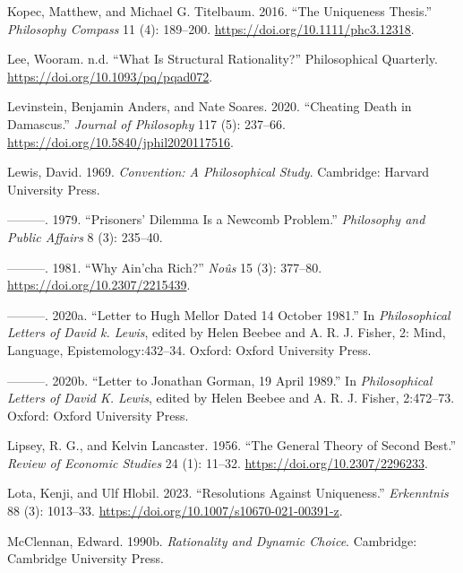 \documentclass[
  12pt,
  letterpaper,
  DIV=11,
  numbers=noendperiod]{scrreprt}
\newlength{\cslhangindent}
\newenvironment{CSLReferences}[2] %
 {\begin{list}{}{%
  \setlength{\itemindent}{0pt}
  \setlength{\leftmargin}{0pt}
  \setlength{\parsep}{0pt}
  \ifodd #1
   \setlength{\leftmargin}{\cslhangindent}
   \setlength{\itemindent}{-1\cslhangindent}
  \fi
  \setlength{\itemsep}{#2\baselineskip}}}
 {\end{list}}
\begin{document}
\begin{CSLReferences}{1}{0}
Kopec, Matthew, and Michael G. Titelbaum. 2016. {``The Uniqueness
Thesis.''} \emph{Philosophy Compass} 11 (4): 189--200.
\url{https://doi.org/10.1111/phc3.12318}.

Lee, Wooram. n.d. {``What Is Structural Rationality?''} Philosophical
Quarterly. \url{https://doi.org/10.1093/pq/pqad072}.

Levinstein, Benjamin Anders, and Nate Soares. 2020. {``Cheating Death in
Damascus.''} \emph{Journal of Philosophy} 117 (5): 237--66.
\url{https://doi.org/10.5840/jphil2020117516}.

Lewis, David. 1969. \emph{Convention: A Philosophical Study}. Cambridge:
Harvard University Press.

---------. 1979. {``Prisoners' Dilemma Is a {N}ewcomb Problem.''}
\emph{Philosophy and Public Affairs} 8 (3): 235--40.

---------. 1981. {``Why Ain'cha Rich?''} \emph{No{û}s} 15 (3): 377--80.
\url{https://doi.org/10.2307/2215439}.

---------. 2020a. {``Letter to Hugh Mellor Dated 14 October 1981.''} In
\emph{Philosophical Letters of David k. Lewis}, edited by Helen Beebee
and A. R. J. Fisher, 2: Mind, Language, Epistemology:432--34. Oxford:
Oxford University Press.

---------. 2020b. {``Letter to Jonathan Gorman, 19 April 1989.''} In
\emph{Philosophical Letters of David {K}. Lewis}, edited by Helen Beebee
and A. R. J. Fisher, 2:472--73. Oxford: Oxford University Press.

Lipsey, R. G., and Kelvin Lancaster. 1956. {``The General Theory of
Second Best.''} \emph{Review of Economic Studies} 24 (1): 11--32.
\url{https://doi.org/10.2307/2296233}.

Lota, Kenji, and Ulf Hlobil. 2023. {``Resolutions Against Uniqueness.''}
\emph{Erkenntnis} 88 (3): 1013--33.
\url{https://doi.org/10.1007/s10670-021-00391-z}.

McClennan, Edward. 1990b. \emph{Rationality and Dynamic Choice}.
Cambridge: {C}ambridge {U}niversity {P}ress.


\end{CSLReferences}
\end{document}
